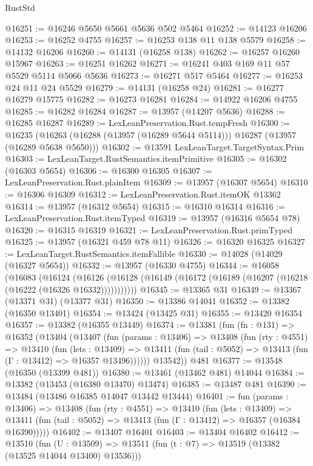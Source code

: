 \begin{lexlean}{RustStd}
\begin{coremodule}
@16251 := @16246 @5650 @5661 @5636 @502 @5464
@16252 := @14123 @16206
@16253 := @16252 @4755
@16257 := @16253 @138 @11 @138 @5579
@16258 := @14132 @16206
@16260 := @14131 (@16258 @138)
@16262 := @16257 @16260 @15967
@16263 := @16251 @16262
@16271 := @16241 @403 @169 @11 @57 @5529 @5114 @5066 @5636
@16273 := @16271 @517 @5464
@16277 := @16253 @24 @11 @24 @5529
@16279 := @14131 (@16258 @24)
@16281 := @16277 @16279 @15775
@16282 := @16273 @16281
@16284 := @14922 @16206 @4755
@16285 := @16282 @16284
@16287 := @13957 (@14207 @5636)
@16288 := @16285 @16287
@16289 := LexLeanPreservation.Rust.tempFresh
@16300 := @16235
    (@16263 (@16288 (@13957 (@16289 @5644 @5114))) @16287 (@13957 (@16289 @5638 @5650)))
@16302 := @13591 LexLeanTarget.TargetSyntax.Prim
@16303 := LexLeanTarget.RustSemantics.itemPrimitive
@16305 := @16302 (@16303 @5654)
@16306 := @16300 @16305
@16307 := LexLeanPreservation.Rust.plainItem
@16309 := @13957 (@16307 @5654)
@16310 := @16306 @16309
@16312 := LexLeanPreservation.Rust.itemOK @13362
@16314 := @13957 (@16312 @5654)
@16315 := @16310 @16314
@16316 := LexLeanPreservation.Rust.itemTyped
@16319 := @13957 (@16316 @5654 @78)
@16320 := @16315 @16319
@16321 := LexLeanPreservation.Rust.primTyped
@16325 := @13957 (@16321 @459 @78 @11)
@16326 := @16320 @16325
@16327 := LexLeanTarget.RustSemantics.itemFallible
@16330 := @14028 (@14029 (@16327 @5654))
@16332 := @13957 (@16330 @4755)
@16344 := @16058
    (@16083
      (@16124
        (@16126 (@16128 (@16149 (@16172 (@16189 (@16207 (@16218 (@16222 (@16326 @16332)))))))))))
@16345 := @13365 @31
@16349 := @13367 (@13371 @31) (@13377 @31)
@16350 := @13386 @14041
@16352 := @13382 (@16350 @13401)
@16354 := @13424 (@13425 @31)
@16355 := @13420 @16354
@16357 := @13382 (@16355 @13449)
@16374 := @13381
    (fun (fn : @131) =>
    @16352
      (@13404
        (@13407
          (fun (params : @13406) =>
          @13408
            (fun (rty : @4551) =>
            @13410
              (fun (lets : @13409) =>
              @13411 (fun (tail : @5052) => @13413 (fun (Γ : @13412) => @16357 @13496))))))
        @13542))
    @481
@16377 := @13548 (@16350 (@13399 @481))
@16380 := @13461 (@13462 @481) @14044
@16384 := @13382 (@13453 (@16380 @13470) @13474)
@16385 := @13487 @481
@16390 := @13484 (@13486 @16385 @14047 @13442 @13444)
@16401 := fun (params : @13406) =>
  @13408
    (fun (rty : @4551) =>
    @13410
      (fun (lets : @13409) =>
      @13411 (fun (tail : @5052) => @13413 (fun (Γ : @13412) => @16357 (@16384 @16390)))))
@16402 := @13407 @16401
@16403 := @13404 @16402
@16412 := @13510
    (fun (U : @13509) => @13511 (fun (t : @7) => @13519 (@13382 (@13525 @14044 @13400) @13536)))

\end{coremodule}
\end{lexlean}
